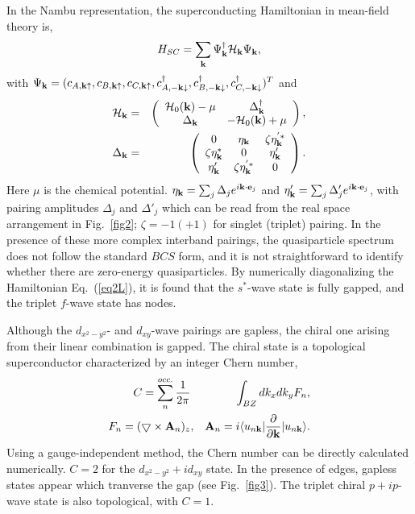 \documentclass[%
 reprint,
 amsmath,amssymb,
 aps,
]{revtex4-1}
\begin{document}
In the Nambu representation,
the superconducting Hamiltonian in mean-field theory is,
\begin{eqnarray}\label{eq2}
H_{SC}=\sum_{\bf k}\Psi^{\dagger}_{\bf k}{\cal H}_{\bf k}\Psi_{\bf k},
\end{eqnarray}
with $\Psi_{\bf k}=(c_{A,{\bf k}\uparrow}, c_{B,{\bf
k}\uparrow}, c_{C,{\bf k}\uparrow}, c^{\dagger}_{A,-{\bf
k}\downarrow}, c^{\dagger}_{B,-{\bf
k}\downarrow},c^{\dagger}_{C,-{\bf k}\downarrow})^{T}$ and
\begin{eqnarray}\label{eq2L}
{\cal H}_{\bf k}&=&\left(
                   \begin{array}{cc}
                     {\cal H}_{0}({\bf k})-\mu & \Delta^{\dagger}_{\bf k} \\
                     \Delta_{\bf k} & -{\cal H}_{0}({\bf k})+\mu \\
                   \end{array}
                 \right),  \\\nonumber
\Delta_{\bf k}&=&\left(
                   \begin{array}{ccc}
                     0 & \eta_{\bf k} & \zeta\eta_{\bf k}^{'*} \\
                    \zeta \eta^{*}_{\bf k} &0 & \eta'_{\bf k} \\
                      \eta'_{\bf k} & \zeta \eta^{'*}_{\bf k} & 0
                   \end{array}
                 \right).
\end{eqnarray}
Here $\mu$ is the chemical potential.
$\eta_{\bf k}=\sum_{j} \Delta_j
e^{i {\bf k} \cdot {\bf e}_j}$ and $\eta'_{\bf k}=\sum_{j} \Delta'_j
e^{i {\bf k} \cdot {\bf e}_j}$, with pairing amplitudes $\Delta_j$
and $\Delta'_j$ which can be read from the real space arrangement in
Fig.~\ref{fig2}; $\zeta=-1 (+1)$ for singlet (triplet) pairing.  In the
presence of these more complex
interband pairings, the quasiparticle spectrum does not
follow the standard $BCS$ form,
and it is not straightforward to identify
whether there are zero-energy quasiparticles.
By numerically
diagonalizing the Hamiltonian Eq.~(\ref{eq2L}), it is found that the $s^*$-wave
state is fully gapped, and the triplet $f$-wave state has nodes.

Although the $d_{x^2-y^2}$- and $d_{xy}$-wave pairings are gapless, the
chiral one arising from their linear combination
is gapped.
The chiral state is a topological
superconductor characterized by an integer Chern
number\cite{chern},
\begin{eqnarray}\label{eqC}
C=\sum^{occ.}_{n}\frac{1}{2\pi}&&\int_{BZ}dk_xdk_y F_n,  \\ \nonumber
F_n=(\bigtriangledown\times {\bf A}_n)_z&,& {\bf A}_n=i\langle u_{n{\bf k}}|\frac{\partial}{\partial {\bf k}}|u_{n{\bf k}}\rangle.
\end{eqnarray}
Using a gauge-independent method, the Chern number can be directly
calculated numerically\cite{chern1}.  $C=2$ for the
$d_{x^2-y^2}+id_{xy}$ state. In the presence of edges,
gapless states appear which tranverse the gap (see Fig.~\ref{fig3}).
The triplet chiral
$p+ip$-wave state is also topological, with $C=1$.
\end{document}
